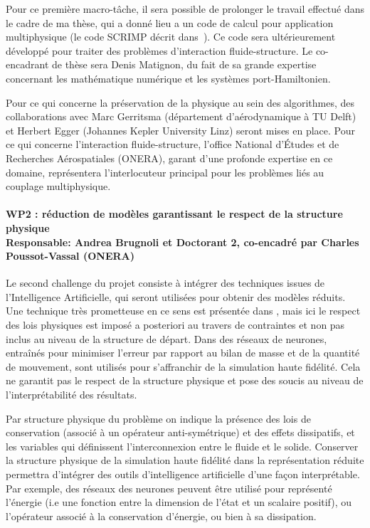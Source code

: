 \documentclass[12pt, french]{article}
\begin{document}
Pour ce première macro-tâche, il sera possible de prolonger le travail effectué dans le cadre de ma thèse, qui a donn\'e lieu a un code de calcul pour application multiphysique (le code SCRIMP décrit dans~\cite{brugnoli2021num}). Ce code sera ultérieurement développé pour traiter des problèmes d'interaction fluide-structure. Le co-encadrant de thèse sera Denis Matignon, du fait de sa grande expertise concernant les mathématique numérique et les systèmes port-Hamiltonien.

Pour ce qui concerne la préservation de la physique au sein des algorithmes, des collaborations avec Marc Gerritsma (département d'aérodynamique à TU Delft) et Herbert Egger (Johannes Kepler University Linz) seront mises en place. Pour ce qui concerne l'interaction fluide-structure, l'office National d'Études et de Recherches Aérospatiales (ONERA), garant d'une profonde expertise en ce domaine, représentera l'interlocuteur principal pour les problèmes liés au couplage multiphysique.

\paragraph{\large WP2 : réduction de modèles garantissant le respect de la structure physique\\
Responsable: Andrea Brugnoli et Doctorant 2, co-encadré par Charles Poussot-Vassal (ONERA)\\}

Le second challenge du projet consiste à intégrer des techniques issues de l’Intelligence
Artificielle, qui seront utilisées pour obtenir des modèles réduits. Une technique très prometteuse en ce sens est présentée dans \cite{lee2020}, mais ici le respect des lois physiques est imposé a posteriori au travers de contraintes et non pas inclus au niveau de la structure de départ. Dans \cite{sun2020physics} des réseaux de neurones, entraînés pour minimiser l’erreur par rapport au bilan de masse et de la quantité de mouvement, sont utilisés pour s’affranchir de la simulation haute fidélité. Cela ne garantit pas le respect de la structure physique et pose des soucis au niveau de l’interprétabilité des résultats.

Par structure physique du problème on indique la présence des lois de conservation (associé à un opérateur anti-symétrique) et des effets dissipatifs, et les variables qui définissent l'interconnexion entre le fluide et le solide. Conserver la structure physique de la simulation haute fidélité dans la représentation réduite permettra d’intégrer des outils d’intelligence artificielle d’une façon interprétable. Par exemple, des réseaux des neurones peuvent être utilisé pour représenté l'énergie (i.e une fonction entre la dimension de l'état et un scalaire positif), ou l'opérateur associé à la conservation d'énergie, ou bien à sa dissipation. 
\end{document}
